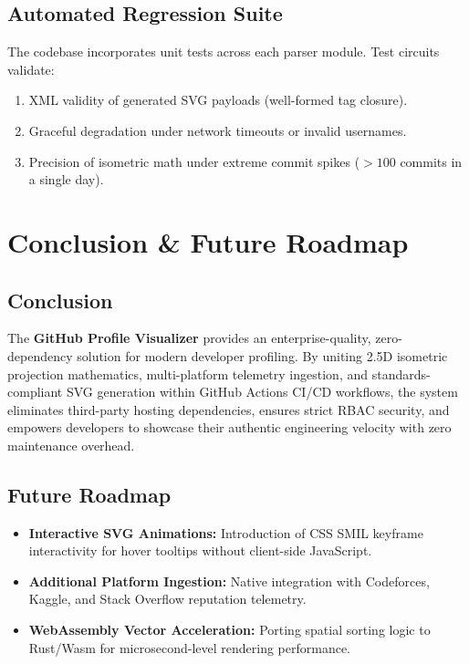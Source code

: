 \documentclass[12pt,a4paper]{report}
\begin{document}
\section{Automated Regression Suite}
The codebase incorporates unit tests across each parser module. Test circuits validate:
\begin{enumerate}
    \item XML validity of generated SVG payloads (well-formed tag closure).
    \item Graceful degradation under network timeouts or invalid usernames.
    \item Precision of isometric math under extreme commit spikes ($>100$ commits in a single day).
\end{enumerate}

\chapter{Conclusion \& Future Roadmap}

\section{Conclusion}
The \textbf{GitHub Profile Visualizer} provides an enterprise-quality, zero-dependency solution for modern developer profiling. By uniting 2.5D isometric projection mathematics, multi-platform telemetry ingestion, and standards-compliant SVG generation within GitHub Actions CI/CD workflows, the system eliminates third-party hosting dependencies, ensures strict RBAC security, and empowers developers to showcase their authentic engineering velocity with zero maintenance overhead.

\section{Future Roadmap}
\begin{itemize}
    \item \textbf{Interactive SVG Animations:} Introduction of CSS SMIL keyframe interactivity for hover tooltips without client-side JavaScript.
    \item \textbf{Additional Platform Ingestion:} Native integration with Codeforces, Kaggle, and Stack Overflow reputation telemetry.
    \item \textbf{WebAssembly Vector Acceleration:} Porting spatial sorting logic to Rust/Wasm for microsecond-level rendering performance.
\end{itemize}
\end{document}

